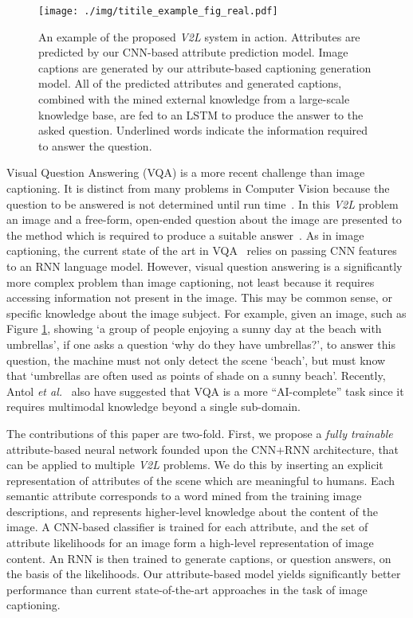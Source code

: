 \documentclass[10pt,journal,compsoc]{IEEEtran}
\newcommand{\etal}{\emph{et al.}}
\def\V2L{\textit{V2L}}
\begin{document}
\begin{figure}[t!]
\centering
  \texttt{[image: ./img/titile\_example\_fig\_real.pdf]}
  \vspace{-5pt}
  \caption{
    An example of the proposed \V2L system in action. Attributes are predicted by our CNN-based attribute prediction model.
    Image captions are generated by our attribute-based captioning generation model.
All of the predicted attributes and generated captions, combined with the mined external knowledge
    from a large-scale knowledge base, are fed to an LSTM to produce the answer to the asked question.
    Underlined words indicate the information required to answer the question.}
  \label{img:example}
  \vspace{-15pt}
\end{figure}


Visual Question Answering (VQA) is a more recent challenge than image captioning. It is distinct from many problems in Computer Vision because the question to be answered is not determined until run time~\cite{antol2015vqa}. In this \V2L problem an image and a free-form, open-ended question about the image are presented to the method which is required to produce a suitable answer~\cite{antol2015vqa}. As in image captioning,
 the current state of the art in VQA~\cite{gao2015you,malinowski2015ask,ren2015image}
 relies on passing CNN features to an RNN language model.
 However, visual question answering is a significantly more complex problem than image captioning, not least because it requires accessing information not present in the image.  This may be common sense, or specific knowledge about the image subject. For example, given an image, such as Figure \ref{img:example}, showing `a group of people enjoying a sunny day at the beach with umbrellas', if one asks a question `why do they have umbrellas?', to answer this question, the machine must not only detect the scene `beach', but must know that `umbrellas are often used as points of shade on a sunny beach'. Recently, Antol \etal~\cite{antol2015vqa} also have suggested that VQA is a more ``AI-complete'' task since it requires multimodal knowledge beyond a single sub-domain. 

The contributions of this paper are two-fold.
First, we propose a {\em fully trainable} attribute-based neural network founded upon the CNN+RNN architecture,
that can be applied to multiple \textit{V2L} problems.
We do this by inserting an explicit representation of attributes of the scene which are meaningful to humans.
Each semantic attribute corresponds to a word mined from the training image descriptions, and represents higher-level
knowledge about the content of the image. A CNN-based classifier is trained for each attribute,
and the set of attribute likelihoods for an image form a high-level representation of image content.
An RNN is then trained to generate captions, or question answers, on the basis of the likelihoods.
Our attribute-based model yields significantly better performance than current state-of-the-art approaches in the task of image captioning. 
\end{document}

